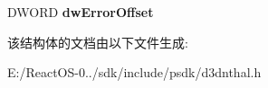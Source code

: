 \begin{DoxyCompactItemize}
\begin{tabbing}
\end{tabbing}\item 
\mbox{\label{struct___d3_d_n_t_h_a_l___d_r_a_w_p_r_i_m_i_t_i_v_e_s2_d_a_t_a_a450de96389d79bca07e3a28d94113625}} 
D\+W\+O\+RD {\bfseries dw\+Error\+Offset}
\end{DoxyCompactItemize}


该结构体的文档由以下文件生成\+:\begin{DoxyCompactItemize}
\item 
E\+:/\+React\+O\+S-\/0../sdk/include/psdk/d3dnthal.\+h\end{DoxyCompactItemize}
